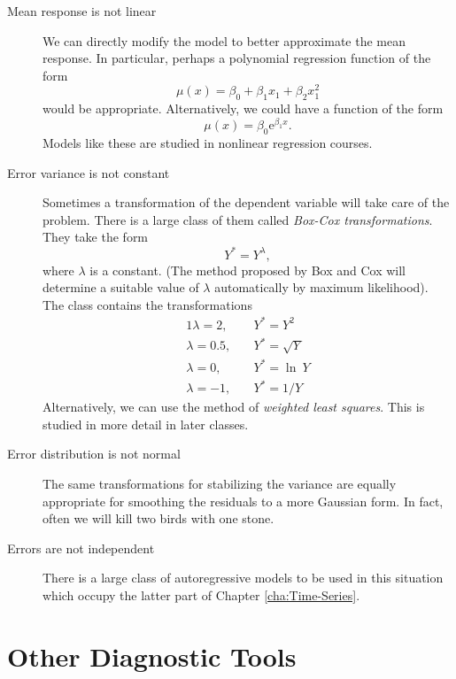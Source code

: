 \documentclass[captions=tableheading]{scrbook}
\begin{document}
\begin{description}
\item[Mean response is not linear] We can directly modify the model to better approximate the mean response. In particular, perhaps a polynomial regression function of the form 
  \[
  \mu(x) = \beta_{0} + \beta_{1}x_{1} + \beta_{2}x_{1}^{2}
  \]
  would be appropriate. Alternatively, we could have a function of the form
  \[
  \mu(x)=\beta_{0}\mathrm{e}^{\beta_{1}x}.
  \]
  Models like these are studied in nonlinear regression courses.
\item[Error variance is not constant] Sometimes a transformation of the dependent variable will take care of the problem. There is a large class of them called \emph{Box-Cox transformations}. They take the form 
  \begin{equation}
  Y^{\ast}=Y^{\lambda},
  \end{equation}
  where \(\lambda\) is a constant. (The method proposed by Box and Cox will determine a suitable value of \(\lambda\) automatically by maximum likelihood). The class contains the transformations 
  \begin{alignat*}{1}
  \lambda=2,\quad & Y^{\ast}=Y^{2}\\
  \lambda=0.5,\quad & Y^{\ast}=\sqrt{Y}\\
  \lambda=0,\quad & Y^{\ast}=\ln\: Y\\
  \lambda=-1,\quad & Y^{\ast}=1/Y
  \end{alignat*}
  Alternatively, we can use the method of \emph{weighted least squares}. This is studied in more detail in later classes.
\item[Error distribution is not normal] The same transformations for stabilizing the variance are equally appropriate for smoothing the residuals to a more Gaussian form. In fact, often we will kill two birds with one stone.
\item[Errors are not independent] There is a large class of autoregressive models to be used in this situation which occupy the latter part of Chapter \ref{cha:Time-Series}.
\end{description}
\section{Other Diagnostic Tools}
\label{sec-1-5}

\label{sec:Other-Diagnostic-Tools-SLR}
\end{document}

